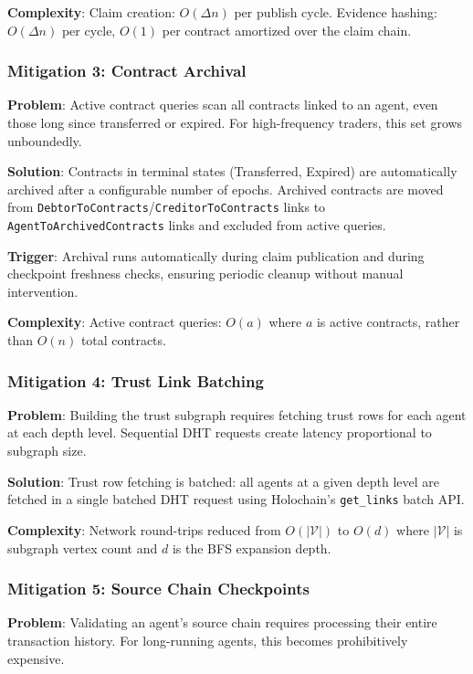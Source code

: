 \documentclass[11pt]{article}
\begin{document}
\textbf{Complexity}: Claim creation: $O(\Delta n)$ per publish cycle. Evidence hashing: $O(\Delta n)$ per cycle, $O(1)$ per contract amortized over the claim chain.

\subsubsection{Mitigation 3: Contract Archival}

\textbf{Problem}: Active contract queries scan all contracts linked to an agent, even those long since transferred or expired. For high-frequency traders, this set grows unboundedly.

\textbf{Solution}: Contracts in terminal states (Transferred, Expired) are automatically archived after a configurable number of epochs. Archived contracts are moved from \texttt{DebtorToContracts}/\texttt{CreditorToContracts} links to \texttt{AgentToArchivedContracts} links and excluded from active queries.

\textbf{Trigger}: Archival runs automatically during claim publication and during checkpoint freshness checks, ensuring periodic cleanup without manual intervention.

\textbf{Complexity}: Active contract queries: $O(a)$ where $a$ is active contracts, rather than $O(n)$ total contracts.

\subsubsection{Mitigation 4: Trust Link Batching}

\textbf{Problem}: Building the trust subgraph requires fetching trust rows for each agent at each depth level. Sequential DHT requests create latency proportional to subgraph size.

\textbf{Solution}: Trust row fetching is batched: all agents at a given depth level are fetched in a single batched DHT request using Holochain's \texttt{get\_links} batch API.

\textbf{Complexity}: Network round-trips reduced from $O(|\mathcal{V}|)$ to $O(d)$ where $|\mathcal{V}|$ is subgraph vertex count and $d$ is the BFS expansion depth.

\subsubsection{Mitigation 5: Source Chain Checkpoints}

\textbf{Problem}: Validating an agent's source chain requires processing their entire transaction history. For long-running agents, this becomes prohibitively expensive.
\end{document}
